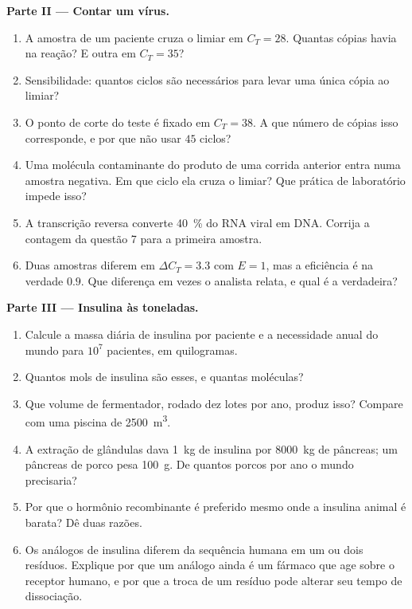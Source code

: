 \begin{problem}
\medskip
\noindent\textbf{Parte II --- Contar um vírus.}
\begin{enumerate}[resume]
  \item A amostra de um paciente cruza o limiar em $C_{T} = 28$.
        Quantas cópias havia na reação? E outra em $C_{T} = 35$?
  \item Sensibilidade: quantos ciclos são necessários para levar uma
        única cópia ao limiar?
  \item O ponto de corte do teste é fixado em $C_{T} = 38$. A que
        número de cópias isso corresponde, e por que não usar $45$
        ciclos?
  \item Uma molécula contaminante do produto de uma corrida anterior
        entra numa amostra negativa. Em que ciclo ela cruza o limiar?
        Que prática de laboratório impede isso?
  \item A transcrição reversa converte \qty{40}{\%} do RNA viral em
        DNA. Corrija a contagem da questão 7 para a primeira amostra.
  \item Duas amostras diferem em $\Delta C_{T} = 3.3$ com $E = 1$, mas
        a eficiência é na verdade $0.9$. Que diferença em vezes o
        analista relata, e qual é a verdadeira?
\end{enumerate}

\medskip
\noindent\textbf{Parte III --- Insulina às toneladas.}
\begin{enumerate}[resume]
  \item Calcule a massa diária de insulina por paciente e a necessidade
        anual do mundo para $10^{7}$ pacientes, em quilogramas.
  \item Quantos mols de insulina são esses, e quantas moléculas?
  \item Que volume de fermentador, rodado dez lotes por ano, produz
        isso? Compare com uma piscina de \qty{2500}{m^3}.
  \item A extração de glândulas dava \qty{1}{kg} de insulina por
        \qty{8000}{kg} de pâncreas; um pâncreas de porco pesa
        \qty{100}{g}. De quantos porcos por ano o mundo precisaria?
  \item Por que o hormônio recombinante é preferido mesmo onde a
        insulina animal é barata? Dê duas razões.
  \item Os análogos de insulina diferem da sequência humana em um ou
        dois resíduos. Explique por que um análogo ainda é um fármaco
        que age sobre o receptor humano, e por que a troca de um
        resíduo pode alterar seu tempo de dissociação.
\end{enumerate}


\end{problem}
